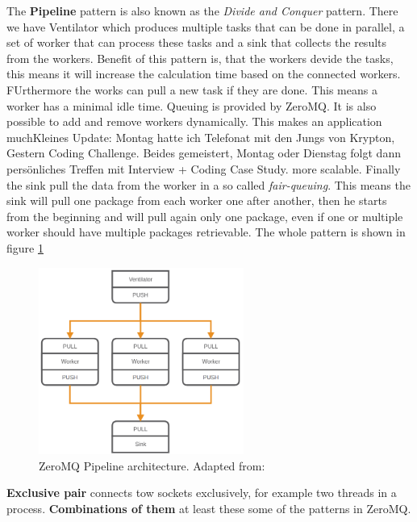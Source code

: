 The \textbf{Pipeline} pattern is also known as the \textit{Divide and Conquer} pattern.
There we have Ventilator which produces multiple tasks that can be done in parallel, a set of worker that can process these tasks and a sink that collects the results from the workers.\autocite{ZeroMQ:Guide}
Benefit of this pattern is, that the workers devide the tasks, this means it will increase the calculation time based on the connected workers.
FUrthermore the works can pull a new task if they are done.
This means a worker has a minimal idle time.
Queuing is provided by ZeroMQ.
It is also possible to add and remove workers dynamically.
This makes an application muchKleines Update: Montag hatte ich Telefonat mit den Jungs von Krypton, Gestern Coding Challenge. Beides gemeistert, Montag oder Dienstag folgt dann persönliches Treffen mit Interview + Coding Case Study. more scalable.
Finally the sink pull the data from the worker in a so called \textit{fair-queuing}.
This means the sink will pull one package from each worker one after another, then he starts from the beginning and will pull again only one package, even if one or multiple worker should have multiple packages retrievable.
The whole pattern is shown in figure \ref{fig:zeromq_pipeline}\newline
\begin{figure}[H]
    \centering
    \includegraphics[width=0.6\textwidth]{resources/images/zeromq-vernitlator.png}
    \caption[ZeroMQ Pipeline architecture]{ZeroMQ Pipeline architecture. Adapted from: \autocite{ZeroMQ:Guide}}
    \label{fig:zeromq_pipeline}
\end{figure}
\textbf{Exclusive pair} connects tow sockets exclusively, for example two threads in a process.\autocite{ZeroMQ:Guide}
\newline
\textbf{Combinations of them} at least these some of the patterns in ZeroMQ.
